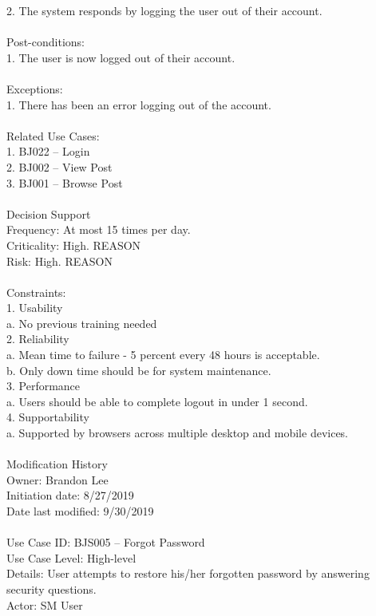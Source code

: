 \documentclass{report}
\begin{document}
2.	The system responds by logging the user out of their account.\\
\\
Post-conditions: \\
1.	The user is now logged out of their account.\\
\\
Exceptions: \\
1.	There has been an error logging out of the account.\\
\\
Related Use Cases: \\
1.	BJ022 – Login\\
2.	BJ002 – View Post\\
3.	BJ001 – Browse Post\\
\\
Decision Support\\
     Frequency: At most 15 times per day.\\
     Criticality: High. REASON\\
     Risk: High. REASON\\
\\
Constraints: \\
1.	Usability\\
a.	No previous training needed\\
2.  Reliability\\
a.	Mean time to failure - 5 percent every 48 hours is acceptable.\\
b.	Only down time should be for system maintenance.\\
3.	Performance\\
a.	Users should be able to complete logout in under 1 second.\\
4. 	Supportability\\
a. 	Supported by browsers across multiple desktop and mobile devices.\\
\\
Modification History\\
     Owner: Brandon Lee\\
     Initiation date: 8/27/2019\\
     Date last modified: 9/30/2019\\
\\
Use Case ID: BJS005 – Forgot Password\\
Use Case Level: High-level\\
Details: User attempts to restore his/her forgotten password by answering security questions.\\
Actor: SM User\\
\end{document}

